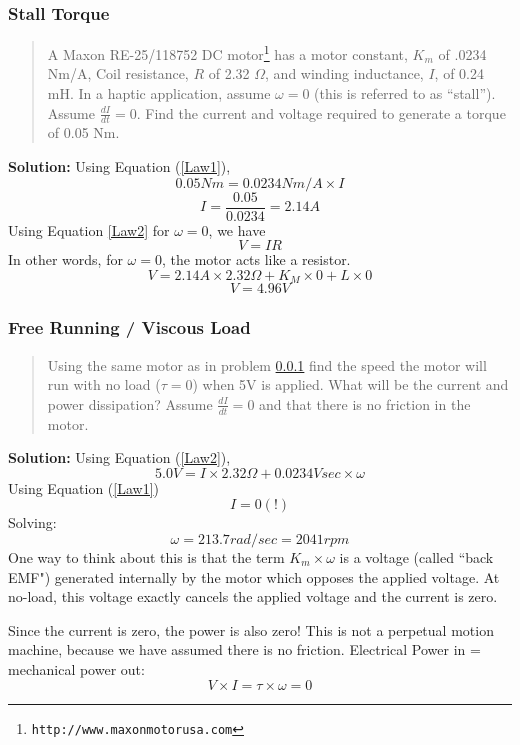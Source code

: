 \subsubsection{Stall Torque}\label{StallProb}
\begin{quotation}
A Maxon RE-25/118752 DC motor\footnote{{\tt http://www.maxonmotorusa.com}} has a motor
constant, $K_m$ of .0234 Nm/A, Coil resistance, $R$ of 2.32 $\Omega$, and winding
inductance, $I$, of 0.24 mH.  In a haptic application, assume $\omega=0$ (this is referred
to as ``stall'').  Assume $\frac{dI}{dt} = 0$. Find the current and voltage required
to generate a torque of 0.05 Nm.
\end{quotation}
{\bf Solution:} Using Equation (\ref{Law1}),
\[
0.05  Nm = 0.0234 Nm/A \times I
\]
\[
I = \frac{0.05}{0.0234} = 2.14A
\]
Using Equation \ref{Law2} for $\omega =0$, we have
\[
V = IR
\]
In other words, for $\omega=0$, the motor acts like a resistor.
\[
V = 2.14A \times 2.32 \Omega + K_M \times 0 + L \times 0
\]
\[
V = 4.96V
\]

\subsubsection{Free Running / Viscous Load}
\begin{quotation}
Using the same motor as in problem \ref{StallProb} find the speed the motor will run with
no load ($\tau = 0$) when 5V is applied.  What will be the current and power dissipation?
Assume $\frac{dI}{dt} = 0$ and that there is no friction in the motor.
\end{quotation}
{\bf Solution:} Using Equation (\ref{Law2}),
\[
5.0V = I\times 2.32 \Omega + 0.0234 Vsec \times \omega
\]
Using Equation (\ref{Law1})
\[
I = 0 (!)
\]
Solving:
\[
\omega = 213.7 rad/sec = 2041 rpm
\]
One way to think about this is that the term $K_m \times \omega$ is a voltage (called
``back EMF") generated internally by the motor which opposes the applied voltage. At no-load,
this voltage exactly cancels the applied voltage and the current is zero.

Since the current is zero, the power is also zero!   This is not
a perpetual motion machine, because
we have assumed there is no friction. Electrical Power in = mechanical power
out:
\[
V\times I = \tau \times \omega = 0
\]


